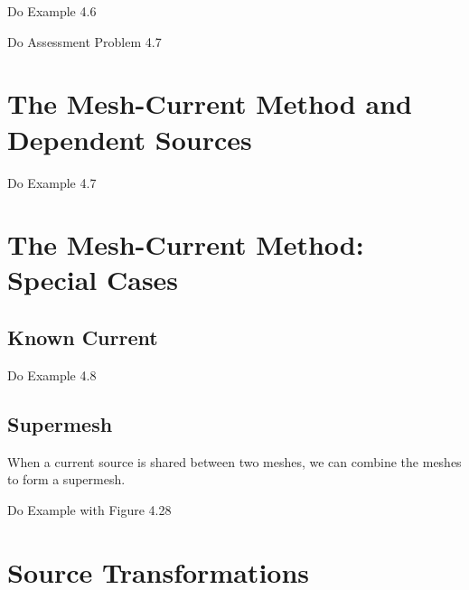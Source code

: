 \documentclass[14pt]{memoir}
\begin{document}
\begin{tcolorbox}
Do Example 4.6
\end{tcolorbox}

\begin{tcolorbox}
Do Assessment Problem 4.7
\end{tcolorbox}

\section{The Mesh-Current Method and Dependent Sources}

\begin{tcolorbox}
Do Example 4.7
\end{tcolorbox}


\section{The Mesh-Current Method: Special Cases}

\subsection{Known Current}
\begin{tcolorbox}
Do Example 4.8
\end{tcolorbox}

\subsection{Supermesh}
When a current source is shared between two meshes, we can combine the meshes to form a supermesh.

\begin{tcolorbox}
Do Example with Figure 4.28
\end{tcolorbox}

\section{Source Transformations}
\end{document}
